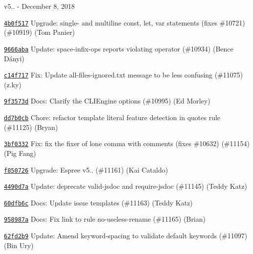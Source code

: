 v5.. -\/ December 8, 2018


\begin{DoxyItemize}
\item \href{https://github.com/eslint/eslint/commit/4b0f517cd317e5f1b99a1e8a0392332bd8a2e231}{\texttt{ {\ttfamily 4b0f517}}} Upgrade\+: single-\/ and multiline const, let, var statements (fixes \#10721) (\#10919) (Tom Panier)
\item \href{https://github.com/eslint/eslint/commit/9666abaf46c841fba7b5d4e53c6998cd25b9bc33}{\texttt{ {\ttfamily 9666aba}}} Update\+: space-\/infix-\/ops reports violating operator (\#10934) (Bence Dányi)
\item \href{https://github.com/eslint/eslint/commit/c14f717f4c32860766185da47f64f8eb0c2d2998}{\texttt{ {\ttfamily c14f717}}} Fix\+: Update all-\/files-\/ignored.\+txt message to be less confusing (\#11075) (z.\+ky)
\item \href{https://github.com/eslint/eslint/commit/9f3573dda3dc35bc220e945686cc835eaad0ac2c}{\texttt{ {\ttfamily 9f3573d}}} Docs\+: Clarify the C\+L\+I\+Engine options (\#10995) (Ed Morley)
\item \href{https://github.com/eslint/eslint/commit/dd7b0cb019d94964930d30fec36f7b22ef072822}{\texttt{ {\ttfamily dd7b0cb}}} Chore\+: refactor template literal feature detection in \textquotesingle{}quotes\textquotesingle{} rule (\#11125) (Bryan)
\item \href{https://github.com/eslint/eslint/commit/3bf0332508b921cb660c2e8a1ab7ddf46a2013b6}{\texttt{ {\ttfamily 3bf0332}}} Fix\+: fix the fixer of lone comma with comments (fixes \#10632) (\#11154) (Pig Fang)
\item \href{https://github.com/eslint/eslint/commit/f8507260c2091d18488fde20e466639d1a7f913c}{\texttt{ {\ttfamily f850726}}} Upgrade\+: Espree v5.. (\#11161) (Kai Cataldo)
\item \href{https://github.com/eslint/eslint/commit/4490d7af529d4ecc18b6874f1d838869656da58a}{\texttt{ {\ttfamily 4490d7a}}} Update\+: deprecate valid-\/jsdoc and require-\/jsdoc (\#11145) (Teddy Katz)
\item \href{https://github.com/eslint/eslint/commit/60dfb6c623dfe829e5350dabe507e7850c1beacf}{\texttt{ {\ttfamily 60dfb6c}}} Docs\+: Update issue templates (\#11163) (Teddy Katz)
\item \href{https://github.com/eslint/eslint/commit/958987aa6f5630faa051d8f822f0200faff41924}{\texttt{ {\ttfamily 958987a}}} Docs\+: Fix link to rule no-\/useless-\/rename (\#11165) (Brian)
\item \href{https://github.com/eslint/eslint/commit/62fd2b93448966331db3eb2dfbe4e1273eb032b2}{\texttt{ {\ttfamily 62fd2b9}}} Update\+: Amend keyword-\/spacing to validate {\ttfamily default} keywords (\#11097) (Bin Ury)

\end{DoxyItemize}
